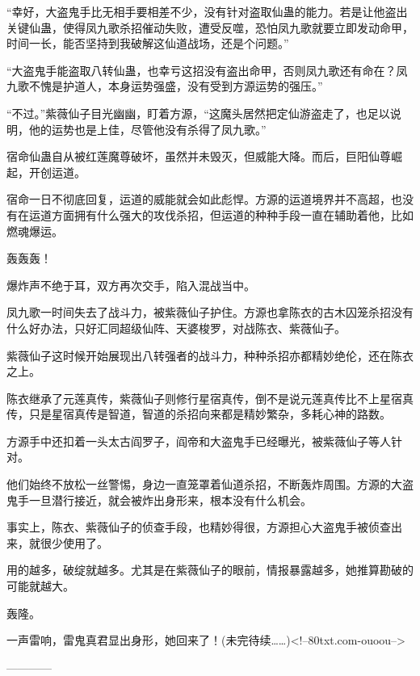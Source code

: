 \begin{this_body}
“幸好，大盗鬼手比无相手要相差不少，没有针对盗取仙蛊的能力。若是让他盗出关键仙蛊，使得凤九歌杀招催动失败，遭受反噬，恐怕凤九歌就要立即发动命甲，时间一长，能否坚持到我破解这仙道战场，还是个问题。”

“大盗鬼手能盗取八转仙蛊，也幸亏这招没有盗出命甲，否则凤九歌还有命在？凤九歌不愧是护道人，本身运势强盛，没有受到方源运势的强压。”

“不过。”紫薇仙子目光幽幽，盯着方源，“这魔头居然把定仙游盗走了，也足以说明，他的运势也是上佳，尽管他没有杀得了凤九歌。”

宿命仙蛊自从被红莲魔尊破坏，虽然并未毁灭，但威能大降。而后，巨阳仙尊崛起，开创运道。

宿命一日不彻底回复，运道的威能就会如此彪悍。方源的运道境界并不高超，也没有在运道方面拥有什么强大的攻伐杀招，但运道的种种手段一直在辅助着他，比如燃魂爆运。

轰轰轰！

爆炸声不绝于耳，双方再次交手，陷入混战当中。

凤九歌一时间失去了战斗力，被紫薇仙子护住。方源也拿陈衣的古木囚笼杀招没有什么好办法，只好汇同超级仙阵、天婆梭罗，对战陈衣、紫薇仙子。

紫薇仙子这时候开始展现出八转强者的战斗力，种种杀招亦都精妙绝伦，还在陈衣之上。

陈衣继承了元莲真传，紫薇仙子则修行星宿真传，倒不是说元莲真传比不上星宿真传，只是星宿真传是智道，智道的杀招向来都是精妙繁杂，多耗心神的路数。

方源手中还扣着一头太古阎罗子，阎帝和大盗鬼手已经曝光，被紫薇仙子等人针对。

他们始终不放松一丝警惕，身边一直笼罩着仙道杀招，不断轰炸周围。方源的大盗鬼手一旦潜行接近，就会被炸出身形来，根本没有什么机会。

事实上，陈衣、紫薇仙子的侦查手段，也精妙得很，方源担心大盗鬼手被侦查出来，就很少使用了。

用的越多，破绽就越多。尤其是在紫薇仙子的眼前，情报暴露越多，她推算勘破的可能就越大。

轰隆。

一声雷响，雷鬼真君显出身形，她回来了！(未完待续……)<!--80txt.com-ouoou-->

------------

\end{this_body}

